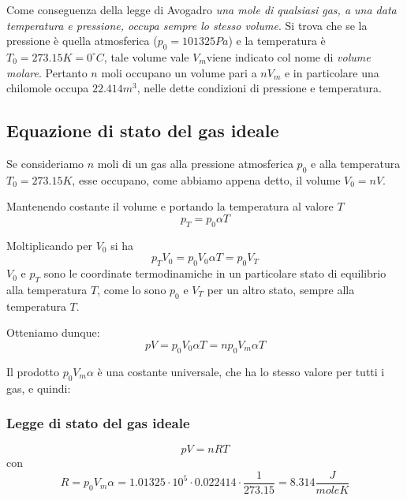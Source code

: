 \documentclass[class=book, crop=false, oneside, 12pt]{standalone}
\begin{document}
Come conseguenza della legge di Avogadro \emph{una mole di qualsiasi gas, a una data temperatura e pressione, occupa sempre lo stesso volume}.\newline
Si trova che se la pressione è quella atmosferica (\( p_0 = 101325 Pa\)) e la temperatura è \(T_0 = 273.15 K = 0 ^{\circ} C \), tale volume vale \(V_m\)viene indicato col nome di \emph{volume molare}. 
Pertanto \(n\) moli occupano un volume pari a \(n V_m\) e in particolare una chilomole occupa \(22.414 m^3\), nelle dette condizioni di pressione e temperatura. 

\subsection{Equazione di stato del gas ideale}

Se consideriamo \(n\) moli di un gas alla pressione atmosferica \(p_0\) e alla temperatura \(T_0 = 273.15 K\), esse occupano, come abbiamo appena detto, il volume \(V_0 = n V\).

Mantenendo costante il volume e portando la temperatura al valore \(T\)
\begin{equation*}
    p_T = p_0 \alpha T
\end{equation*} 

Moltiplicando per \(V_0\) si ha
\begin{equation*}
    p_T V_0 = p_0 V_0 \alpha T = p_0 V_T
\end{equation*}
\(V_0\) e \(p_T\) sono le coordinate termodinamiche in un particolare stato di equilibrio alla temperatura \(T\), 
come lo sono \(p_0\) e \(V_T\) per un altro stato, sempre alla temperatura \(T\).

Otteniamo dunque:
\begin{equation*}
    pV = p_0 V_0 \alpha T = n p_0 V_m \alpha T
\end{equation*}

Il prodotto \(p_0 V_m \alpha\) è una costante universale, che ha lo stesso valore per tutti i gas, e quindi: 

\subsubsection*{Legge di stato del gas ideale}

\begin{equation} \label{eq_stato_gas_ideale}
    p V = n R T
\end{equation}
con
\begin{equation*}
    R = p_0 V_m \alpha = 1.01325 \cdot 10^5 \cdot 0.022414 \cdot \frac{1}{273.15} = 8.314 \frac{J}{mole K}
\end{equation*}
\end{document}
